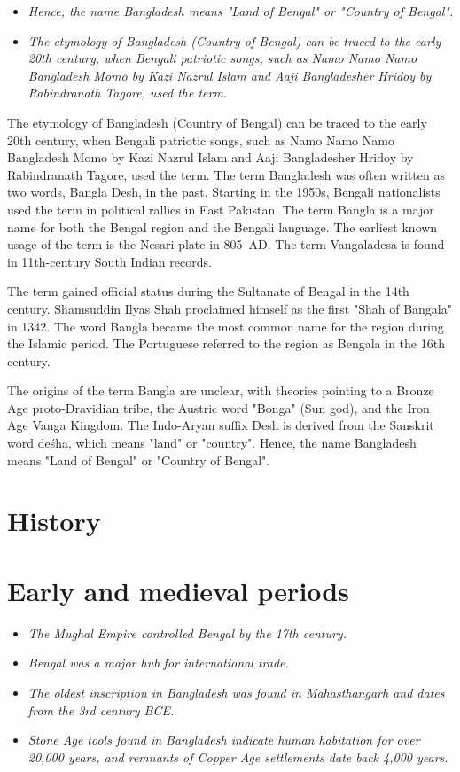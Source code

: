 \begin{itemize}
\item
  \emph{Hence, the name Bangladesh means "Land of Bengal" or "Country of
  Bengal".}
\item
  \emph{The etymology of Bangladesh (Country of Bengal) can be traced to
  the early 20th century, when Bengali patriotic songs, such as Namo
  Namo Namo Bangladesh Momo by Kazi Nazrul Islam and Aaji Bangladesher
  Hridoy by Rabindranath Tagore, used the term.}
\end{itemize}

The etymology of Bangladesh (Country of Bengal) can be traced to the
early 20th century, when Bengali patriotic songs, such as Namo Namo Namo
Bangladesh Momo by Kazi Nazrul Islam and Aaji Bangladesher Hridoy by
Rabindranath Tagore, used the term. The term Bangladesh was often
written as two words, Bangla Desh, in the past. Starting in the 1950s,
Bengali nationalists used the term in political rallies in East
Pakistan. The term Bangla is a major name for both the Bengal region and
the Bengali language. The earliest known usage of the term is the Nesari
plate in 805~AD. The term Vangaladesa is found in 11th-century South
Indian records.

The term gained official status during the Sultanate of Bengal in the
14th century. Shamsuddin Ilyas Shah proclaimed himself as the first
"Shah of Bangala" in 1342. The word Bangla became the most common name
for the region during the Islamic period. The Portuguese referred to the
region as Bengala in the 16th century.

The origins of the term Bangla are unclear, with theories pointing to a
Bronze Age proto-Dravidian tribe, the Austric word "Bonga" (Sun god),
and the Iron Age Vanga Kingdom. The Indo-Aryan suffix Desh is derived
from the Sanskrit word deśha, which means "land" or "country". Hence,
the name Bangladesh means "Land of Bengal" or "Country of Bengal".

\section{History}\label{history}

\section{Early and medieval periods}\label{early-and-medieval-periods}

\begin{itemize}
\item
  \emph{The Mughal Empire controlled Bengal by the 17th century.}
\item
  \emph{Bengal was a major hub for international trade.}
\item
  \emph{The oldest inscription in Bangladesh was found in Mahasthangarh
  and dates from the 3rd century BCE.}
\item
  \emph{Stone Age tools found in Bangladesh indicate human habitation
  for over 20,000 years, and remnants of Copper Age settlements date
  back 4,000 years.}
\end{itemize}

